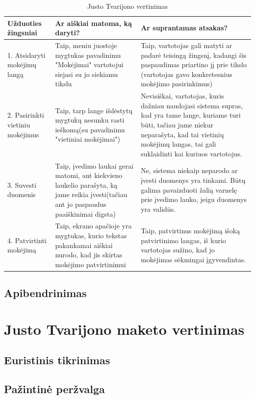 \documentclass[oneside]{VUMIFPSkursinis}
\begin{document}
\begin{center}
\begin{longtable}[!htb]{|p{5cm}|p{5cm}|p{5cm}|}
	\caption{Justo Tvarijono vertinimas}
\endfirsthead
\endhead
	\hline
	Užduoties žingsniai & Ar aiškiai matoma, ką daryti? & Ar suprantamas atsakas? \\ \hline
	1. Atsidaryti mokėjimų langą & Taip, meniu juostoje mygtukas pavadinimu "Mokėjimai" vartotojui siejasi su jo siekiamu tikslu & Taip, vartotojas gali matyti ar padarė teisingą žingsnį, kadangi šis paspaudimas priartino jį prie tikslo (vartotojas gavo konkretesnius mokėjimo pasirinkimus) \\ \hline
	2. Pasirinkti vietiniu mokėjimus & Taip, tarp lange išdėstytų mygtukų nesunku rasti ieškomą(su pavadinimu "vietiniai mokėjimai") & Nevisiškai, vartotojas, kuris dažniau naudojasi sistema supras, kad yra tame lange, kuriame turi būti, tačiau jame niekur neparašyta, kad tai vietinių mokėjimų langas, tai gali suklaidinti kai kuriuos vartotojus. \\ \hline
	3. Suvesti duomenis & Taip, įvedimo laukai gerai matomi, ant kiekvieno laukelio parašyta, ką jame reikia įvesti(tačiau ant jo paspaudus paaiškinimai digsta) & Ne, sistema niekaip neparodo ar įvesti duomenys yra tinkami. Būtų galima pavaizduoti žalią varnelę prie įvedimo lauko, jeigu duomenys yra validūs. \\ \hline
	4. Patvirtinti mokėjimą & Taip, ekrano apačioje yra mygtukas, kurio tekstas pakankamai aiškiai nurodo, kad jis skirtas mokėjimo patvirtinimui & Taip, patvirtinus mokėjimą išoką patvirtinimo langas, iš kurio vartotojas sužino, kad jo mokėjimas sėkmingai įgyvendintas. \\ \hline
\end{longtable}
\end{center}
\subsection{Apibendrinimas}
\section{Justo Tvarijono maketo vertinimas}
\subsection{Euristinis tikrinimas}
\subsection{Pažintinė peržvalga}
\end{document}
